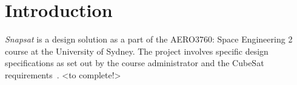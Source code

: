 \section{Introduction}
\textit{Snapsat} is a design solution as a part of the AERO3760: Space Engineering 2 course at the University of Sydney. The project involves specific design specifications as set out by the course administrator and the CubeSat requirements~\cite{requirements}. <to complete!>